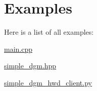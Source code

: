 \section{Examples}
Here is a list of all examples\+:\begin{DoxyCompactItemize}
\item 
\hyperlink{main_8cpp-example}{main.\+cpp}
\item 
\hyperlink{simple_dgm_8hpp-example}{simple\+\_\+dgm.\+hpp}
\item 
\hyperlink{simple_dgm_hwd_client_8py-example}{simple\+\_\+dgm\+\_\+hwd\+\_\+client.\+py}
\end{DoxyCompactItemize}
